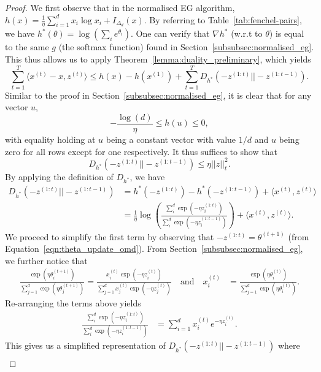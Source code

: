 \begin{proof}
    We first observe that in the normalised EG algorithm, $h(x) = \frac{1}{\eta}\sum_{i=1}^d x_i \log x_i + I_{\Delta_d}(x)$. By referring to Table~\ref{tab:fenchel-pairs}, we have $h^*(\theta) = \log\left(\sum_i e^{\theta_i}\right).$ One can verify that $\nabla h^*$ (w.r.t to $\theta$) is equal to the same $g$ (the softmax function) found in Section~\ref{subsubsec:normalised_eg}. This thus allows us to apply Theorem~\ref{lemma:duality_preliminary}, which yields 
    $$
    \sum_{t=1}^T\langle x^{(t)} - x, z^{(t)} \rangle \leq h(x) - h(x^{(1)}) + \sum_{t=1}^T D_{h^*}(-z^{(1:t)} || -z^{(1:t-1)}).
    $$
    Similar to the proof in Section~\ref{subsubsec:normalised_eg}, it is clear that for any vector $u$, 
    $$ -\frac{\log(d)}{\eta} \leq h(u) \leq 0, $$
    with equality holding at $u$ being a constant vector with value $1/d$ and $u$ being zero for all rows except for one respectively. It thus suffices to show that 
    $$ D_{h^*}(-z^{(1:t)} || -z^{(1:t-1)}) \leq \eta ||z||_t^2. $$
    By applying the definition of $D_{h^*}$, we have
    \begin{align*}
        D_{h^*}(-z^{(1:t)} || -z^{(1:t-1)})
        &= h^*(-z^{(1:t)}) - h^*(-z^{(1:t-1)}) + \langle x^{(t)}, z^{(t)} \rangle \\
        &= \frac{1}{\eta} \log\left( \frac{\sum_{i}^d \exp{\left(-\eta z^{(1:t)}_i\right)}}{\sum_{i}^d \exp{\left(-\eta z^{(1:t-1)}_i\right)}} \right) + \langle x^{(t)}, z^{(t)} \rangle.
    \end{align*}
    We proceed to simplify the first term by observing that $-z^{(1:t)} = \theta^{(t+1)}$ (from Equation~\ref{eqn:theta_update_omd}). From Section~\ref{subsubsec:normalised_eg}, we further notice that 
    \begin{align*}
    \frac{\exp(\eta \theta^{(t+1)}_i)}{\sum_{j=1}^d \exp(\eta \theta^{(t+1)}_j)} = \frac{x^{(t)}_{i} \exp(-\eta z^{(t)}_{i})}{\sum_{j=1}^d x^{(t)}_{j} \exp(-\eta z^{(t)}_{j})} \quad \text{and} \quad x^{(t)}_{i} &= \frac{\exp(\eta \theta^{(t)}_i)}{\sum_{j=1}^d \exp(\eta \theta^{(t)}_i)}.
    \end{align*}
    Re-arranging the terms above yields
    \begin{align*}
        \frac{\sum_{i}^d \exp{\left(-\eta z^{(1:t)}_i\right)}}{\sum_{i}^d \exp{\left(-\eta z^{(1:t-1)}_i\right)}} &= \sum_{i=1}^d x^{(t)}_ie^{-\eta z^{(t)}_i}.
    \end{align*}
    This gives us a simplified representation of $D_{h^*}(-z^{(1:t)} || -z^{(1:t-1)})$ where 
    \begin{align*}

\end{align*}
\end{proof}
